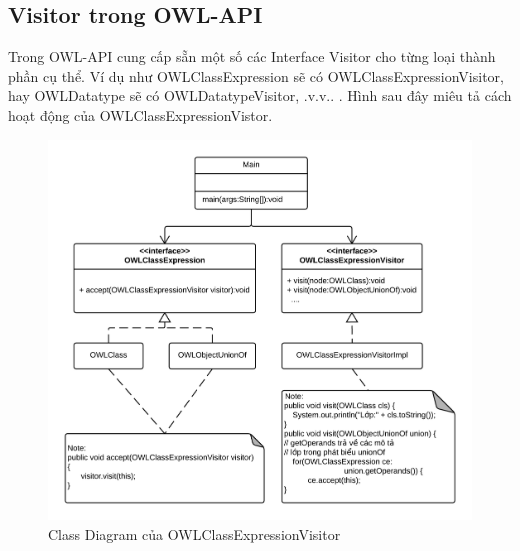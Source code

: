 \subsection{Visitor trong OWL-API}
Trong OWL-API cung cấp sẵn một số các Interface Visitor cho từng loại thành phần cụ thể. Ví dụ như OWLClassExpression sẽ có OWLClassExpressionVisitor, hay OWLDatatype sẽ có OWLDatatypeVisitor, .v.v.. . Hình sau đây miêu tả cách hoạt động của OWLClassExpressionVistor.
\begin{figure}[h!]
	\centering
	\includegraphics[width=145mm]{Figures/uml_classdiagram_classexpressionvistior_nobackground.png}
	\caption{Class Diagram của OWLClassExpressionVisitor \label{overflow}}
\end{figure}
